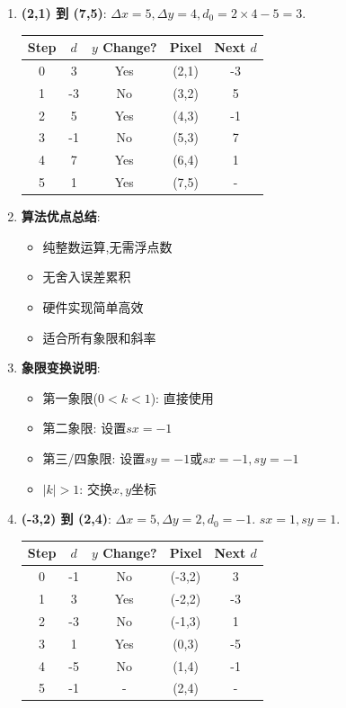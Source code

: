 \documentclass[UTF8]{ctexart}
\begin{document}
\begin{enumerate}
    \item \textbf{(2,1) 到 (7,5)}: $\Delta x=5, \Delta y=4, d_0=2\times 4-5=3$.
    \begin{center}
    \begin{tabular}{ccccc}
    \toprule Step & $d$ & $y$ Change? & Pixel & Next $d$ \\ \midrule
    0 & 3 & Yes & (2,1) & -3 \\
    1 & -3 & No & (3,2) & 5 \\ 2 & 5 & Yes & (4,3) & -1 \\
    3 & -1 & No & (5,3) & 7 \\ 4 & 7 & Yes & (6,4) & 1 \\
    5 & 1 & Yes & (7,5) & - \\ \bottomrule
    \end{tabular}
    \end{center}
    
    \item \textbf{算法优点总结}: 
    \begin{itemize}
        \item 纯整数运算,无需浮点数
        \item 无舍入误差累积
        \item 硬件实现简单高效
        \item 适合所有象限和斜率
    \end{itemize}
    
    \item \textbf{象限变换说明}: 
    \begin{itemize}
        \item 第一象限($0<k<1$): 直接使用
        \item 第二象限: 设置$sx=-1$
        \item 第三/四象限: 设置$sy=-1$或$sx=-1,sy=-1$
        \item $|k|>1$: 交换$x,y$坐标
    \end{itemize}
    
    \item \textbf{(-3,2) 到 (2,4)}: $\Delta x=5, \Delta y=2, d_0=-1$. $sx=1, sy=1$.
    \begin{center}
    \begin{tabular}{ccccc}
    \toprule Step & $d$ & $y$ Change? & Pixel & Next $d$ \\ \midrule
    0 & -1 & No & (-3,2) & 3 \\
    1 & 3 & Yes & (-2,2) & -3 \\ 2 & -3 & No & (-1,3) & 1 \\
    3 & 1 & Yes & (0,3) & -5 \\ 4 & -5 & No & (1,4) & -1 \\
    5 & -1 & - & (2,4) & - \\ \bottomrule
    \end{tabular}
    \end{center}
\end{enumerate}
\end{document}
